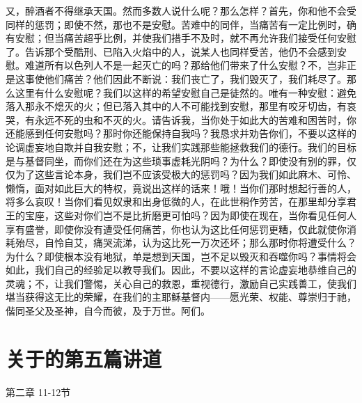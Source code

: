 又，醉酒者不得继承天国。然而多数人说什么呢？那么怎样？首先，你和他不会受同样的惩罚；即使不然，那也不是安慰。苦难中的同伴，当痛苦有一定比例时，确有安慰；但当痛苦超乎比例，并使我们措手不及时，就不再允许我们接受任何安慰了。告诉那个受酷刑、已陷入火焰中的人，说某人也同样受苦，他仍不会感到安慰。难道所有以色列人不是一起灭亡的吗？那给他们带来了什么安慰？不，岂非正是这事使他们痛苦？他们因此不断说：我们丧亡了，我们毁灭了，我们耗尽了。那么这里有什么安慰呢？我们以这样的希望安慰自己是徒然的。唯有一种安慰：避免落入那永不熄灭的火；但已落入其中的人不可能找到安慰，那里有咬牙切齿，有哀哭，有永远不死的虫和不灭的火。请告诉我，当你处于如此大的苦难和困苦时，你还能感到任何安慰吗？那时你还能保持自我吗？我恳求并劝告你们，不要以这样的论调虚妄地自欺并自我安慰；不，让我们实践那些能拯救我们的德行。我们的目标是与基督同坐，而你们还在为这些琐事虚耗光阴吗？为什么？即使没有别的罪，仅仅为了这些言论本身，我们岂不应该受极大的惩罚吗？因为我们如此麻木、可怜、懒惰，面对如此巨大的特权，竟说出这样的话来！哦！当你们那时想起行善的人，将多么哀叹！当你们看见奴隶和出身低微的人，在此世稍作劳苦，在那里却分享君王的宝座，这些对你们岂不是比折磨更可怕吗？因为即使在现在，当你看见任何人享有盛誉，即使你没有遭受任何痛苦，你也认为这比任何惩罚更糟，仅此就使你消耗殆尽，自怜自艾，痛哭流涕，认为这比死一万次还坏；那么那时你将遭受什么？为什么？即使根本没有地狱，单是想到天国，岂不足以毁灭和吞噬你吗？事情将会如此，我们自己的经验足以教导我们。因此，不要以这样的言论虚妄地恭维自己的灵魂；不，让我们警惕，关心自己的救恩，重视德行，激励自己实践善工，使我们堪当获得这无比的荣耀，在我们的主耶稣基督内——愿光荣、权能、尊崇归于祂，偕同圣父及圣神，自今而彼，及于万世。阿们。\par



\section{关于的第五篇讲道}

第二章 11-12节\par

\par

